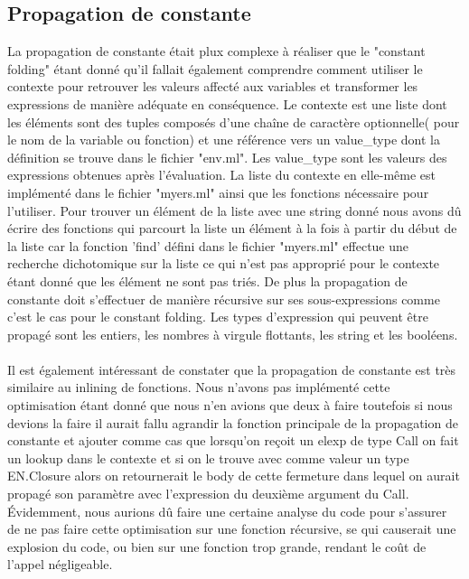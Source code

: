 \documentclass{article}
\begin{document}
\subsection{Propagation de constante}

La propagation de constante était plux complexe à réaliser que le "constant
folding" étant donné qu'il fallait également comprendre comment utiliser le 
contexte pour retrouver les valeurs affecté aux variables et transformer les
expressions de manière adéquate en conséquence. Le contexte est une liste dont
les éléments sont des tuples composés d'une chaîne de caractère optionnelle(
pour le nom de la variable ou fonction) et une référence vers un value\_type
dont la définition se trouve dans le fichier "env.ml". Les value\_type sont
les valeurs des expressions obtenues après l'évaluation. La liste du contexte
en elle-même est implémenté dans le fichier "myers.ml" ainsi que les fonctions
nécessaire pour l'utiliser. Pour trouver un élément de la liste avec une
string donné nous avons dû écrire des fonctions qui parcourt la liste un 
élément à la fois à partir du début de la liste car la fonction 'find' défini
dans le fichier "myers.ml" effectue une recherche dichotomique sur la liste ce
qui n'est pas approprié pour le contexte étant donné que les élément ne sont
pas triés. De plus la propagation de constante doit s'effectuer de manière 
récursive sur ses sous-expressions comme c'est le cas pour le constant folding.
Les types d'expression qui peuvent être propagé sont les entiers, les nombres
à virgule flottants, les string et les booléens.

\paragraph{}
Il est également intéressant de constater que la propagation de constante est
très similaire au inlining de fonctions. Nous n'avons pas implémenté cette
optimisation étant donné que nous n'en avions que deux à faire toutefois si
nous devions la faire il aurait fallu agrandir la fonction principale de
la propagation de constante et ajouter comme cas que lorsqu'on reçoit un elexp
de type Call on fait un lookup dans le contexte et si on le trouve avec comme
valeur un type EN.Closure alors on retournerait le body de cette fermeture dans
lequel on aurait propagé son paramètre avec l'expression du deuxième argument
du Call. Évidemment, nous aurions dû faire une certaine analyse du code pour
s'assurer de ne pas faire cette optimisation sur une fonction récursive, se qui
causerait une explosion du code, ou bien sur une fonction trop grande, rendant
le coût de l'appel négligeable.
\end{document}

